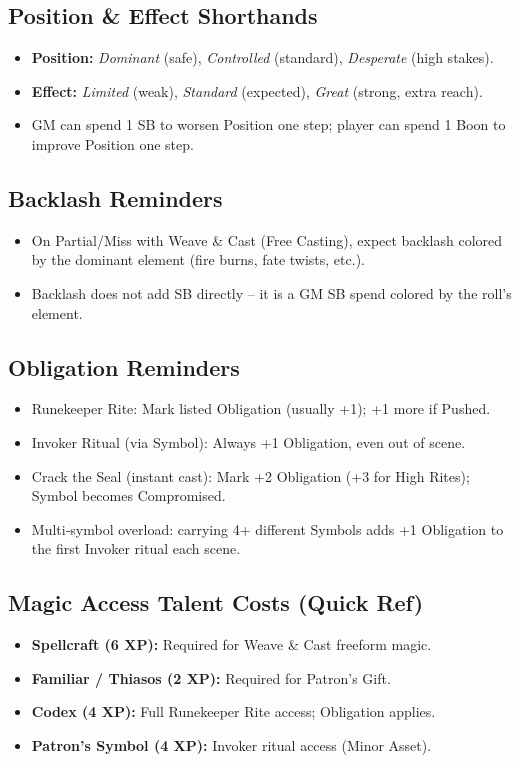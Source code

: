 \subsection{Position \& Effect Shorthands}
\begin{itemize}
  \item \textbf{Position:} \emph{Dominant} (safe), \emph{Controlled} (standard), \emph{Desperate} (high stakes).
  \item \textbf{Effect:} \emph{Limited} (weak), \emph{Standard} (expected), \emph{Great} (strong, extra reach).
  \item GM can spend 1 SB to worsen Position one step; player can spend 1 Boon to improve Position one step.
\end{itemize}

\subsection{Backlash Reminders}
\begin{itemize}
  \item On Partial/Miss with Weave \& Cast (Free Casting), expect backlash colored by the dominant element (fire burns, fate twists, etc.).
  \item Backlash does not add SB directly -- it is a GM SB spend colored by the roll's element.
\end{itemize}

\subsection{Obligation Reminders}
\begin{itemize}
  \item Runekeeper Rite: Mark listed Obligation (usually +1); +1 more if Pushed.
  \item Invoker Ritual (via Symbol): Always +1 Obligation, even out of scene.
  \item Crack the Seal (instant cast): Mark +2 Obligation (+3 for High Rites); Symbol becomes Compromised.
  \item Multi‑symbol overload: carrying 4+ different Symbols adds +1 Obligation to the first Invoker ritual each scene.
\end{itemize}

\subsection{Magic Access Talent Costs (Quick Ref)}
\begin{itemize}
  \item \textbf{Spellcraft (6 XP):} Required for Weave \& Cast freeform magic.
  \item \textbf{Familiar / Thiasos (2 XP):} Required for Patron's Gift.
  \item \textbf{Codex (4 XP):} Full Runekeeper Rite access; Obligation applies.
  \item \textbf{Patron's Symbol (4 XP):} Invoker ritual access (Minor Asset).
\end{itemize}

